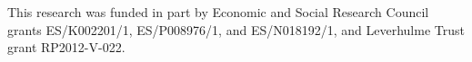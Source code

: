 \documentclass[12pt, a4paper]{article}
\newcommand{\TM}[1]{\textcolor{springgreen3}{TM: #1}}
\begin{document}
\begin{titlepage}

\maketitle
\thispagestyle{empty}
\centering
This research was funded in part by Economic and Social Research Council grants ES/K002201/1, ES/P008976/1, and ES/N018192/1, and Leverhulme Trust grant RP2012-V-022. 
\clearpage
\thispagestyle{empty}
\RaggedRight










\end{titlepage}
\end{document}
